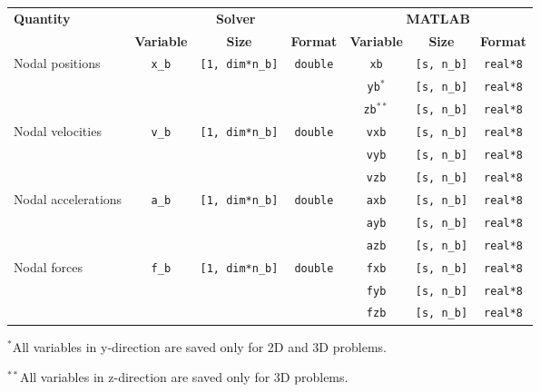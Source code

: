 {\footnotesize
\begin{tabular}{|l|c|c|c|c|c|c|}%
\hline
\multirow{2}{*}{\bf Quantity} & \multicolumn{3}{c|}{\bf Solver} &\multicolumn{3}{c|}{\bf MATLAB} \\ \cline{2-7}
& {\bf Variable} & {\bf Size} & {\bf Format} & {\bf Variable} & {\bf Size} & {\bf Format} \\ \hline
\multirow{3}{1in}{Nodal positions} & \multirow{3}{*}{\texttt{x\_b}} & \multirow{3}{*}{\texttt{[1, dim*n\_b]}} & \multirow{3}{*}{\texttt{double}} & \texttt{xb} & \texttt{[s, n\_b]}& \texttt{real*8}\\ \cline{5-7}
& & & & \texttt{yb}$^*$ & \texttt{[s, n\_b]}& \texttt{real*8} \\ \cline{5-7}
& & & & \texttt{zb}$^{**}$ & \texttt{[s, n\_b]}& \texttt{real*8} \\ \hline
\multirow{3}{1in}{Nodal velocities} & \multirow{3}{*}{\texttt{v\_b}} & \multirow{3}{*}{\texttt{[1, dim*n\_b]}} & \multirow{3}{*}{\texttt{double}} & \texttt{vxb} & \texttt{[s, n\_b]}& \texttt{real*8}\\ \cline{5-7}
& & & & \texttt{vyb} & \texttt{[s, n\_b]}& \texttt{real*8} \\ \cline{5-7}
& & & & \texttt{vzb} & \texttt{[s, n\_b]}& \texttt{real*8} \\ \hline
\multirow{3}{1in}{Nodal accelerations} & \multirow{3}{*}{\texttt{a\_b}} & \multirow{3}{*}{\texttt{[1, dim*n\_b]}} & \multirow{3}{*}{\texttt{double}} & \texttt{axb} & \texttt{[s, n\_b]}& \texttt{real*8}\\ \cline{5-7}
& & & & \texttt{ayb} & \texttt{[s, n\_b]}& \texttt{real*8} \\ \cline{5-7}
& & & & \texttt{azb} & \texttt{[s, n\_b]}& \texttt{real*8} \\ \hline
\multirow{3}{1in}{Nodal forces} & \multirow{3}{*}{\texttt{f\_b}} & \multirow{3}{*}{\texttt{[1, dim*n\_b]}} & \multirow{3}{*}{\texttt{double}} & \texttt{fxb} & \texttt{[s, n\_b]}& \texttt{real*8}\\ \cline{5-7}
& & & & \texttt{fyb} & \texttt{[s, n\_b]}& \texttt{real*8} \\ \cline{5-7}
& & & & \texttt{fzb} & \texttt{[s, n\_b]}& \texttt{real*8} \\ \hline
\end{tabular}
}

$^*$All variables in y-direction are saved only for 2D and 3D problems.

$^{**}$All variables in z-direction are saved only for 3D problems.

